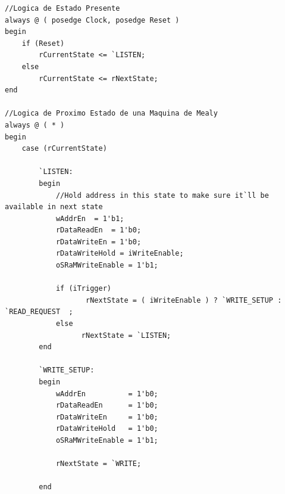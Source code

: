 \documentclass[10pt]{article}
\begin{document}
\begin{lstlisting}
//Logica de Estado Presente
always @ ( posedge Clock, posedge Reset )
begin
	if (Reset)
		rCurrentState <= `LISTEN;
	else
		rCurrentState <= rNextState;
end

//Logica de Proximo Estado de una Maquina de Mealy
always @ ( * )
begin
	case (rCurrentState)

		`LISTEN:
		begin
			//Hold address in this state to make sure it`ll be available in next state
			wAddrEn  = 1'b1;	
			rDataReadEn  = 1'b0;
			rDataWriteEn = 1'b0;
			rDataWriteHold = iWriteEnable;
			oSRaMWriteEnable = 1'b1;

			if (iTrigger)
				   rNextState = ( iWriteEnable ) ? `WRITE_SETUP : `READ_REQUEST  ;
			else 
			      rNextState = `LISTEN;
		end

		`WRITE_SETUP:
		begin
			wAddrEn          = 1'b0;
			rDataReadEn      = 1'b0;
			rDataWriteEn     = 1'b0;
			rDataWriteHold   = 1'b0;
			oSRaMWriteEnable = 1'b1;

			rNextState = `WRITE;
			
		end


\end{lstlisting}
\end{document}
